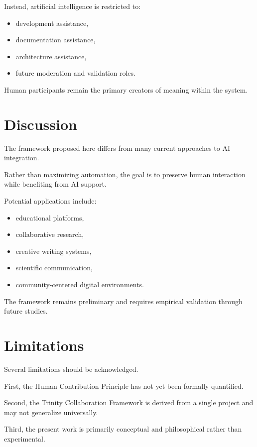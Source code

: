 \documentclass[11pt]{article}
\begin{document}
Instead, artificial intelligence is restricted to:

\begin{itemize}
\item development assistance,
\item documentation assistance,
\item architecture assistance,
\item future moderation and validation roles.
\end{itemize}

Human participants remain the primary creators of meaning within the system.

\section{Discussion}

The framework proposed here differs from many current approaches to AI integration.

Rather than maximizing automation, the goal is to preserve human interaction while benefiting from AI support.

Potential applications include:

\begin{itemize}
\item educational platforms,
\item collaborative research,
\item creative writing systems,
\item scientific communication,
\item community-centered digital environments.
\end{itemize}

The framework remains preliminary and requires empirical validation through future studies.

\section{Limitations}

Several limitations should be acknowledged.

First, the Human Contribution Principle has not yet been formally quantified.

Second, the Trinity Collaboration Framework is derived from a single project and may not generalize universally.

Third, the present work is primarily conceptual and philosophical rather than experimental.
\end{document}
